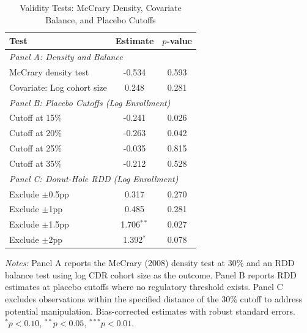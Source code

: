 \begin{table}[t]
\centering
\caption{Validity Tests: McCrary Density, Covariate Balance, and Placebo Cutoffs}
\label{tab:validity}
\begin{tabular}{lcc}
\toprule
Test & Estimate & $p$-value \\
\midrule
\multicolumn{3}{l}{\textit{Panel A: Density and Balance}} \\[0.3em]
McCrary density test & -0.534 & 0.593 \\
Covariate: Log cohort size & 0.248 & 0.281 \\
[0.5em]
\multicolumn{3}{l}{\textit{Panel B: Placebo Cutoffs (Log Enrollment)}} \\[0.3em]
Cutoff at 15\% & -0.241 & 0.026 \\
Cutoff at 20\% & -0.263 & 0.042 \\
Cutoff at 25\% & -0.035 & 0.815 \\
Cutoff at 35\% & -0.212 & 0.528 \\
[0.5em]
\multicolumn{3}{l}{\textit{Panel C: Donut-Hole RDD (Log Enrollment)}} \\[0.3em]
Exclude $\pm$0.5pp & 0.317 & 0.270 \\
Exclude $\pm$1pp & 0.485 & 0.281 \\
Exclude $\pm$1.5pp & 1.706$^{**}$ & 0.027 \\
Exclude $\pm$2pp & 1.392$^{*}$ & 0.078 \\
\bottomrule
\end{tabular}
\begin{minipage}{0.95\textwidth}
\vspace{0.5em}\footnotesize
\textit{Notes:} Panel A reports the McCrary (2008) density test at 30\% and an RDD balance test using log CDR cohort size as the outcome. Panel B reports RDD estimates at placebo cutoffs where no regulatory threshold exists. Panel C excludes observations within the specified distance of the 30\% cutoff to address potential manipulation. Bias-corrected estimates with robust standard errors. $^{*}p<0.10$, $^{**}p<0.05$, $^{***}p<0.01$.
\end{minipage}
\end{table}
